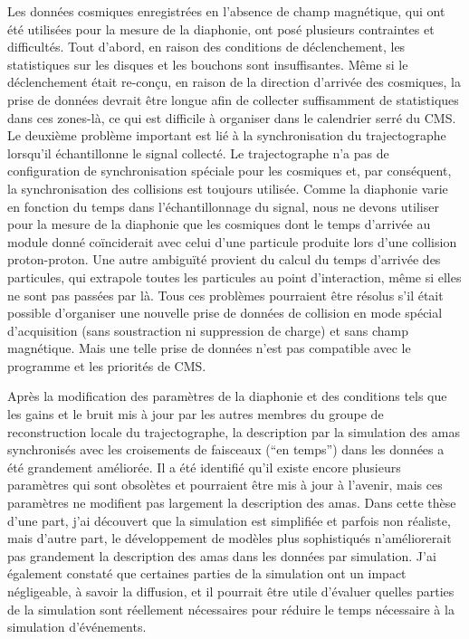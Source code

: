 Les données cosmiques enregistrées en l'absence de champ magnétique, qui ont été utilisées pour la mesure de la diaphonie, ont posé plusieurs contraintes et difficultés. Tout d'abord, en raison des conditions de déclenchement, les statistiques sur les disques et les bouchons sont insuffisantes. Même si le déclenchement était re-conçu, en raison de la direction d'arrivée des cosmiques, la prise de données devrait être longue afin de collecter suffisamment de statistiques dans ces zones-là, ce qui est difficile à organiser dans le calendrier serré du CMS. Le deuxième problème important est lié à la synchronisation du trajectographe lorsqu'il échantillonne le signal collecté. Le trajectographe n'a pas de configuration de synchronisation spéciale pour les cosmiques et, par conséquent, la synchronisation des collisions est toujours utilisée. Comme la diaphonie varie en fonction du temps dans l'échantillonnage du signal, nous ne devons utiliser pour la mesure de la diaphonie que les cosmiques dont le temps d'arrivée au module donné coïnciderait avec celui d'une particule produite lors d'une collision proton-proton. Une autre ambiguïté provient du calcul du temps d'arrivée des particules, qui extrapole toutes les particules au point d'interaction, même si elles ne sont pas passées par là. Tous ces problèmes pourraient être résolus s'il était possible d'organiser une nouvelle prise de données de collision en mode spécial d'acquisition (sans soustraction ni suppression de charge) et sans champ magnétique. Mais une telle prise de données n'est pas compatible avec le programme et les priorités de CMS.


Après la modification des paramètres de la diaphonie et des conditions tels que les gains et le bruit mis à jour par les autres membres du groupe de reconstruction locale du trajectographe, la description par la simulation des amas synchronisés avec les croisements de faisceaux (``en temps'') dans les données a été grandement améliorée. Il a été identifié qu'il existe encore plusieurs paramètres qui sont obsolètes et pourraient être mis à jour à l'avenir, mais ces paramètres ne modifient pas largement la description des amas. Dans cette thèse d'une part, j'ai découvert que la simulation est simplifiée et parfois non réaliste, mais d'autre part, le développement de modèles plus sophistiqués n'améliorerait pas grandement la description des amas dans les données par simulation. J'ai également constaté que certaines parties de la simulation ont un impact négligeable, à savoir la diffusion, et il pourrait être utile d'évaluer quelles parties de la simulation sont réellement nécessaires pour réduire le temps nécessaire à la simulation d'événements.

